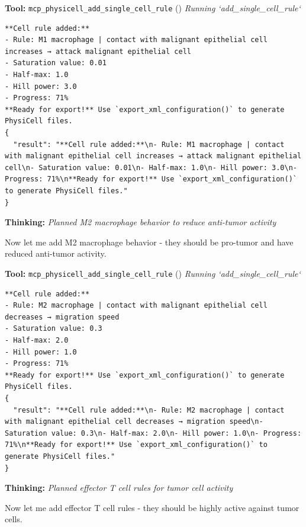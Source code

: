 \documentclass[11pt,a4paper]{article}
\begin{document}
\begin{toolokbox}
\textbf{Tool:} \texttt{mcp\_physicell\_add\_single\_cell\_rule} (\checkmark)
\textit{Running `add\_single\_cell\_rule`}
\begin{lstlisting}
**Cell rule added:**
- Rule: M1 macrophage | contact with malignant epithelial cell increases → attack malignant epithelial cell
- Saturation value: 0.01
- Half-max: 1.0
- Hill power: 3.0
- Progress: 71%
**Ready for export!** Use `export_xml_configuration()` to generate PhysiCell files.
{
  "result": "**Cell rule added:**\n- Rule: M1 macrophage | contact with malignant epithelial cell increases → attack malignant epithelial cell\n- Saturation value: 0.01\n- Half-max: 1.0\n- Hill power: 3.0\n- Progress: 71%\n**Ready for export!** Use `export_xml_configuration()` to generate PhysiCell files."
}
\end{lstlisting}
\end{toolokbox}
\begin{thinkbox}
\textbf{Thinking:} \textit{Planned M2 macrophage behavior to reduce anti-tumor activity}

Now let me add M2 macrophage behavior - they should be pro-tumor and have reduced anti-tumor activity.

\end{thinkbox}
\begin{toolokbox}
\textbf{Tool:} \texttt{mcp\_physicell\_add\_single\_cell\_rule} (\checkmark)
\textit{Running `add\_single\_cell\_rule`}
\begin{lstlisting}
**Cell rule added:**
- Rule: M2 macrophage | contact with malignant epithelial cell decreases → migration speed
- Saturation value: 0.3
- Half-max: 2.0
- Hill power: 1.0
- Progress: 71%
**Ready for export!** Use `export_xml_configuration()` to generate PhysiCell files.
{
  "result": "**Cell rule added:**\n- Rule: M2 macrophage | contact with malignant epithelial cell decreases → migration speed\n- Saturation value: 0.3\n- Half-max: 2.0\n- Hill power: 1.0\n- Progress: 71%\n**Ready for export!** Use `export_xml_configuration()` to generate PhysiCell files."
}
\end{lstlisting}
\end{toolokbox}
\begin{thinkbox}
\textbf{Thinking:} \textit{Planned effector T cell rules for tumor cell activity}

Now let me add effector T cell rules - they should be highly active against tumor cells.

\end{thinkbox}
\end{document}
